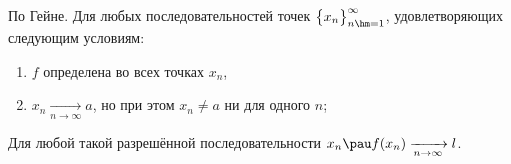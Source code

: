 По Гейне.
    Для любых последовательностей точек $\big\{x_n\big\}_{n\hm=1}^{\infty}$, удовлетворяющих следующим условиям:

    \begin{enumerate}
        \item $f$ определена во всех точках $x_n$,

        \item $x_n\xrightarrow[n\to\infty]{} a$, но при этом $x_n\neq a$ ни для одного $n$;
    \end{enumerate}

Для любой такой разрешённой последовательности $x_n\pau f(x_n)\xrightarrow[n\to\infty]{}l$.
